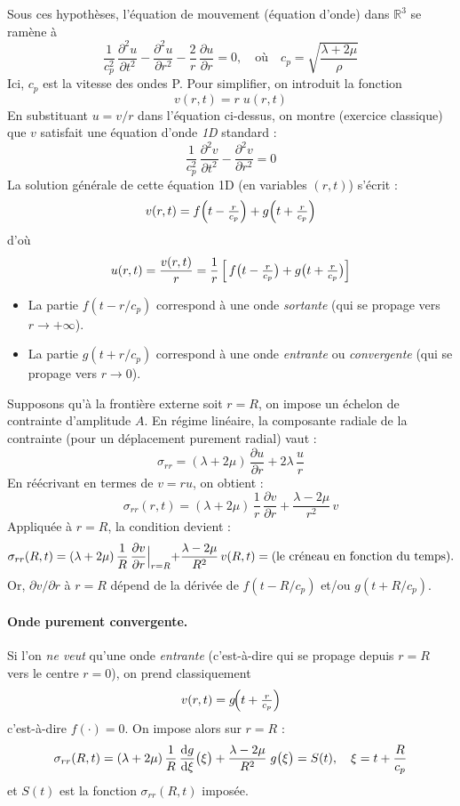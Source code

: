 \documentclass[10pt]{book}
\begin{document}
Sous ces hypothèses, l’équation de mouvement (équation d’onde) dans $\mathbb{R}^3$ se ramène à
$$\frac{1}{c_p^2}\,\frac{\partial^2 u}{\partial t^2}  -\frac{\partial^2 u}{\partial r^2}  -\frac{2}{r}\,\frac{\partial u}{\partial r} =0, \quad \text{où} \quad c_p =\sqrt{\frac{\lambda+2\mu}{\rho}}$$
Ici, $c_p$ est la vitesse des ondes P. Pour simplifier, on introduit la fonction
$$v(r,t) = r\;u(r,t)$$
En substituant $u = v/r$ dans l’équation ci-dessus, on montre (exercice classique) que $v$ satisfait une équation d’onde \emph{1D} standard :
$$\frac{1}{c_p^2}\,\frac{\partial^2 v}{\partial t^2} -\frac{\partial^2 v}{\partial r^2} =0$$
La solution générale de cette équation 1D (en variables $(r,t)$) s’écrit :
$$v(r,t) = f\Bigl(t - \tfrac{r}{c_p}\Bigr) + g\Bigl(t + \tfrac{r}{c_p}\Bigr)$$
d’où
$$u(r,t)=\frac{v(r,t)}{r}=\frac{1}{r}\,\Bigl[\,f\bigl(t - \tfrac{r}{c_p}\bigr)+ g\bigl(t + \tfrac{r}{c_p}\bigr)\Bigr]$$
\begin{itemize}
\item La partie $f(t - r/c_p)$ correspond à une onde \emph{sortante} (qui se propage vers $r \to +\infty$).  
\item La partie $g(t + r/c_p)$ correspond à une onde \emph{entrante} ou \emph{convergente} (qui se propage vers $r \to 0$).  
\end{itemize}
Supposons qu'à la frontière externe soit $r=R$, on impose un échelon de contrainte d'amplitude $A$. En régime linéaire, la composante radiale de la contrainte (pour un déplacement purement radial) vaut :
$$\sigma_{rr} = (\lambda + 2\mu)\,\frac{\partial u}{\partial r} + 2\lambda\,\frac{u}{r}$$
En réécrivant en termes de $v = ru$, on obtient :
$$\sigma_{rr}(r,t)  = (\lambda + 2\mu)\,\frac{1}{r}\,\frac{\partial v}{\partial r} + \frac{\lambda - 2\mu}{r^2}\,v$$
Appliquée à $r=R$, la condition devient :
$$\sigma_{rr}(R,t) = (\lambda + 2\mu)\,\frac{1}{R}\,\frac{\partial v}{\partial r}\Bigl|_{r=R} +
\frac{\lambda - 2\mu}{R^2}\,v(R,t) =
\text{(le créneau en fonction du temps).}$$
Or, $\partial v/\partial r$ à $r=R$ dépend de la dérivée de $f(t - R/c_p)$ et/ou $g(t + R/c_p)$.
\paragraph{Onde purement convergente.}
Si l’on \emph{ne veut} qu’une onde \emph{entrante} (c’est-à-dire qui se propage depuis $r=R$ vers le centre $r=0$), on prend classiquement
$$v(r,t) = g\!\Bigl(t + \tfrac{r}{c_p}\Bigr)$$
c’est-à-dire $f(\cdot) = 0$. On impose alors sur $r=R$ :
$$\sigma_{rr}(R,t)=(\lambda + 2\mu)\,\frac{1}{R}\,\frac{\mathrm{d} g}{\mathrm{d}\xi}\bigl(\xi\bigr)+
\frac{\lambda - 2\mu}{R^2}\;g\bigl(\xi\bigr)=S(t),\quad \xi = t + \frac{R}{c_p}$$
et $S(t)$ est la fonction $\sigma_{rr}(R,t)$ imposée.
\end{document}
